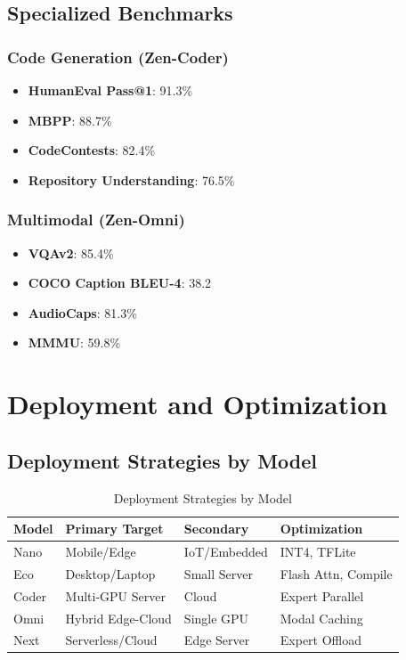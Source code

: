 \documentclass[11pt,a4paper]{article}
\begin{document}
\subsection{Specialized Benchmarks}

\subsubsection{Code Generation (Zen-Coder)}
\begin{itemize}
    \item \textbf{HumanEval Pass@1}: 91.3\%
    \item \textbf{MBPP}: 88.7\%
    \item \textbf{CodeContests}: 82.4\%
    \item \textbf{Repository Understanding}: 76.5\%
\end{itemize}

\subsubsection{Multimodal (Zen-Omni)}
\begin{itemize}
    \item \textbf{VQAv2}: 85.4\%
    \item \textbf{COCO Caption BLEU-4}: 38.2
    \item \textbf{AudioCaps}: 81.3\%
    \item \textbf{MMMU}: 59.8\%
\end{itemize}

\section{Deployment and Optimization}

\subsection{Deployment Strategies by Model}

\begin{table}[H]
\centering
\begin{tabular}{llll}
\toprule
\textbf{Model} & \textbf{Primary Target} & \textbf{Secondary} & \textbf{Optimization} \\
\midrule
Nano & Mobile/Edge & IoT/Embedded & INT4, TFLite \\
Eco & Desktop/Laptop & Small Server & Flash Attn, Compile \\
Coder & Multi-GPU Server & Cloud & Expert Parallel \\
Omni & Hybrid Edge-Cloud & Single GPU & Modal Caching \\
Next & Serverless/Cloud & Edge Server & Expert Offload \\
\bottomrule
\end{tabular}
\caption{Deployment Strategies by Model}
\end{table}
\end{document}

